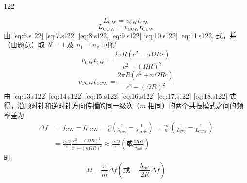 \begin{solution}{122}
\begin{subsolution}
        \begin{equation}
            L_{\mathrm{CW}} = v_{\mathrm{CW}} t_{\mathrm{CW}}
            \label{eq:15.s122}
        \end{equation}
        \begin{equation}
            L_{\mathrm{CCW}} = v_{\mathrm{CCW}} t_{\mathrm{CCW}}
            \label{eq:16.s122}
        \end{equation}
        由 \eqref{eq:6.s122} \eqref{eq:7.s122} \eqref{eq:8.s122} \eqref{eq:9.s122} \eqref{eq:10.s122} \eqref{eq:11.s122} 式，并（由题意）取 $N=1$ 及 $n_{1}=n$，可得
        \begin{equation}
            v_{\mathrm{CW}} t_{\mathrm{CW}} = \frac{2 \pi R (c^{2} - n \Omega R c)}{c^{2} - (\Omega R)^{2}}
            \label{eq:17.s122}
        \end{equation}
        \begin{equation}
            v_{\mathrm{CCW}} t_{\mathrm{CCW}} = \frac{2 \pi R (c^{2} + n \Omega R c)}{c^{2} - (\Omega R)^{2}}
            \label{eq:18.s122}
        \end{equation}
        由 \eqref{eq:13.s122} \eqref{eq:14.s122} \eqref{eq:15.s122} \eqref{eq:16.s122} \eqref{eq:17.s122} \eqref{eq:18.s122} 式得，沿顺时针和逆时针方向传播的同一级次（$m$ 相同）的两个共振模式之间的频率差为
        \begin{align}
            \Delta f & = f_{\mathrm{CW}} - f_{\mathrm{CCW}} = \frac{c}{n} \left(\frac{1}{\lambda_{\mathrm{CW}}} - \frac{1}{\lambda_{\mathrm{CCW}}}\right) = \frac{m c}{n} \left(\frac{1}{L_{\mathrm{CW}}} - \frac{1}{L_{\mathrm{CCW}}}\right) \nonumber \\
            & = \frac{m \Omega}{\pi} \frac{c^{2} - (\Omega R)^{2}}{c^{2} - (n \Omega R)^{2}} \approx \frac{m \Omega}{\pi} (\text{或} \frac{2 R \Omega}{\lambda_{\mathrm{m0}}})
        \end{align}
        即
        \begin{equation}
            \Omega = \frac{\pi}{m} \Delta f (\text{或} = \frac{\lambda_{\mathrm{m0}}}{2 R} \Delta f)
            \label{eq:19.s122}
        \end{equation}
    \end{subsolution}
\end{solution}